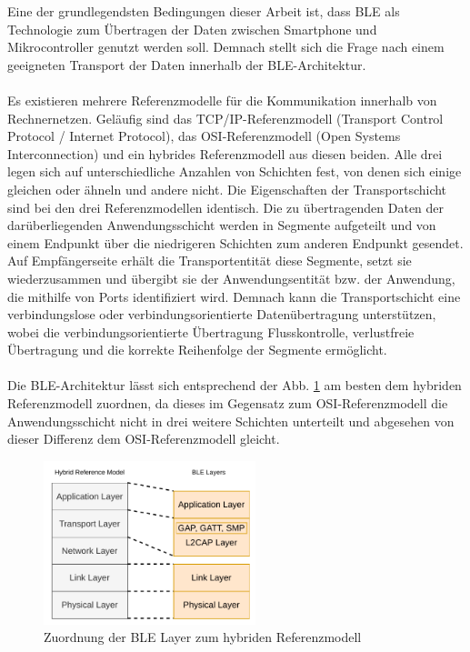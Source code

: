 Eine der grundlegendsten Bedingungen dieser Arbeit ist, dass BLE als Technologie zum Übertragen der Daten zwischen Smartphone und Mikrocontroller genutzt werden soll. Demnach stellt sich die Frage nach einem geeigneten Transport der Daten innerhalb der BLE-Architektur.
\\\\
Es existieren mehrere Referenzmodelle für die Kommunikation innerhalb von Rechnernetzen. Geläufig sind das TCP/IP-Referenzmodell (Transport Control Protocol / Internet Protocol), das OSI-Referenzmodell (Open Systems Interconnection) und ein hybrides Referenzmodell aus diesen beiden. Alle drei legen sich auf unterschiedliche Anzahlen von Schichten fest, von denen sich einige gleichen oder ähneln und andere nicht. Die Eigenschaften der Transportschicht sind bei den drei Referenzmodellen identisch. Die zu übertragenden Daten der darüberliegenden Anwendungsschicht werden in Segmente aufgeteilt und von einem Endpunkt über die niedrigeren Schichten zum anderen Endpunkt gesendet. Auf Empfängerseite erhält die Transportentität diese Segmente, setzt sie wiederzusammen und übergibt sie der Anwendungsentität bzw. der Anwendung, die mithilfe von Ports identifiziert wird. Demnach kann die Transportschicht eine verbindungslose oder verbindungsorientierte Datenübertragung unterstützen, wobei die verbindungsorientierte Übertragung Flusskontrolle, verlustfreie Übertragung und die korrekte Reihenfolge der Segmente ermöglicht. \cite{Baun2019_36-40}
\\\\
Die BLE-Architektur lässt sich entsprechend der Abb. \ref{fig: hyb referenzmodell ble} am besten dem hybriden Referenzmodell zuordnen, da dieses im Gegensatz zum OSI-Referenzmodell die Anwendungsschicht nicht in drei weitere Schichten unterteilt und abgesehen von dieser Differenz dem OSI-Referenzmodell gleicht.

\begin{figure}[H]
    \centering
    \includegraphics[width=0.55\textwidth]{graphics/hybr_referenzmodell_zu_ble.pdf}
    \caption[Zuordnung der BLE Layer zum hybriden Referenzmodell]{Zuordnung der BLE Layer zum hybriden Referenzmodell}
    \label{fig: hyb referenzmodell ble}
\end{figure}

